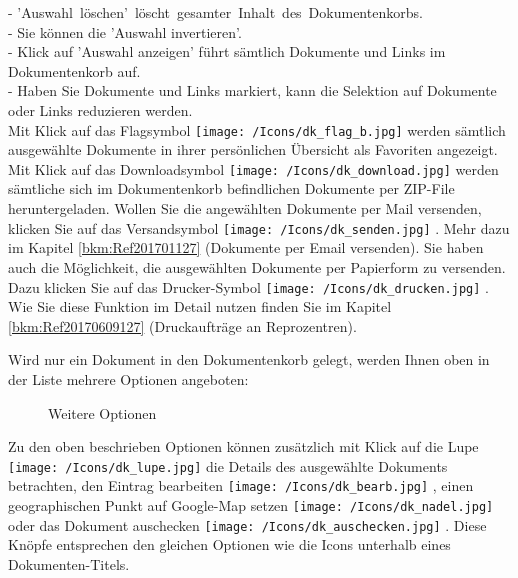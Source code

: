 - \mbox{'Auswahl löschen' löscht gesamter Inhalt des Dokumentenkorbs.}\\
- Sie können die 'Auswahl invertieren'.\\
- Klick auf 'Auswahl anzeigen' führt sämtlich Dokumente und Links im Dokumentenkorb auf.\\
- Haben Sie Dokumente und Links markiert, kann die Selektion auf Dokumente oder Links reduzieren werden.\\

Mit Klick auf das Flagsymbol \texttt{[image: /Icons/dk\_flag\_b.jpg]}  werden sämtlich ausgewählte Dokumente in ihrer persönlichen Übersicht als Favoriten angezeigt. \\
Mit Klick auf das Downloadsymbol \texttt{[image: /Icons/dk\_download.jpg]}  werden sämtliche sich im Dokumentenkorb befindlichen Dokumente per ZIP-File heruntergeladen. Wollen Sie die angewählten Dokumente per Mail versenden, klicken Sie auf das Versandsymbol \texttt{[image: /Icons/dk\_senden.jpg]} . Mehr dazu im Kapitel \ref{bkm:Ref201701127} (Dokumente per Email versenden). Sie haben auch die Möglichkeit, die ausgewählten Dokumente per Papierform zu versenden. Dazu klicken Sie auf das Drucker-Symbol \texttt{[image: /Icons/dk\_drucken.jpg]} . Wie Sie diese Funktion im Detail nutzen finden Sie im Kapitel \ref{bkm:Ref20170609127} (Druckaufträge an Reprozentren).

\vspace{\baselineskip}

Wird nur ein Dokument in den Dokumentenkorb gelegt, werden Ihnen oben in der Liste mehrere Optionen angeboten:

\begin{figure}[H]
\caption{Weitere Optionen}
\end{figure}

Zu den oben beschrieben Optionen können zusätzlich mit Klick auf die Lupe \texttt{[image: /Icons/dk\_lupe.jpg]}  die Details des ausgewählte Dokuments betrachten, den Eintrag bearbeiten \texttt{[image: /Icons/dk\_bearb.jpg]} , einen geographischen Punkt auf Google-Map setzen \texttt{[image: /Icons/dk\_nadel.jpg]}  oder das Dokument auschecken \texttt{[image: /Icons/dk\_auschecken.jpg]} . Diese Knöpfe entsprechen den gleichen Optionen wie die Icons unterhalb eines Dokumenten-Titels.

